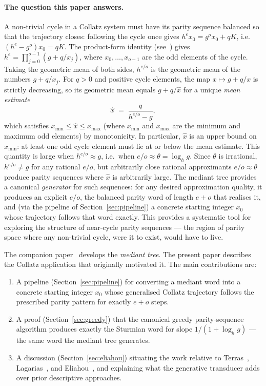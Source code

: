 \documentclass[12pt]{article}
\theoremstyle{definition}
\theoremstyle{remark}
\theoremstyle{plain}
\begin{document}
\paragraph{The question this paper answers.}
A non-trivial cycle in a Collatz system must have its parity sequence balanced so
that the trajectory closes: following the cycle once gives $h^e x_0 = g^o x_0 + qK$,
i.e.\ $(h^e - g^o)x_0 = qK$.
The product-form identity (see~\cite{eliahou1993,paper21}) gives
$h^e = \prod_{j=0}^{o-1}(g + q/x_j)$, where $x_0, \ldots, x_{o-1}$ are the
odd elements of the cycle.
Taking the geometric mean of both sides, $h^{e/o}$ is the geometric mean of the
numbers $g + q/x_j$.
For $q > 0$ and positive cycle elements, the map $x \mapsto g + q/x$ is
strictly decreasing, so its geometric mean equals $g + q/\hat{x}$ for a unique
\emph{mean estimate}
\[
  \hat{x} \;=\; \frac{q}{h^{e/o} - g},
\]
which satisfies $x_{\min} \leq \hat{x} \leq x_{\max}$ (where $x_{\min}$ and
$x_{\max}$ are the minimum and maximum odd elements) by monotonicity.
In particular, $\hat{x}$ is an upper bound on $x_{\min}$: at least one odd cycle
element must lie at or below the mean estimate.
This quantity is large when $h^{e/o} \approx g$, i.e.\ when $e/o \approx \theta = \log_h g$.
Since $\theta$ is irrational, $h^{e/o} \neq g$ for any rational $e/o$, but
arbitrarily close rational approximants $e/o \approx \theta$ produce parity sequences
where $\hat{x}$ is arbitrarily large.
The mediant tree provides a canonical \emph{generator} for such sequences:
for any desired approximation quality, it produces an explicit $e/o$, the balanced
parity word of length $e+o$ that realises it, and (via the pipeline of
Section~\ref{sec:pipeline}) a concrete starting integer $x_0$ whose trajectory
follows that word exactly.
This provides a systematic tool for exploring the structure of near-cycle parity
sequences --- the region of parity space where any non-trivial cycle, were it to exist,
would have to live.

The companion paper~\cite{paper76} develops the \emph{mediant tree}.
The present paper describes the Collatz application that originally motivated it.
The main contributions are:
\begin{enumerate}
  \item A pipeline (Section~\ref{sec:pipeline}) for converting a mediant word into
    a concrete starting integer $x_0$ whose generalised Collatz trajectory follows
    the prescribed parity pattern for exactly $e + o$ steps.
  \item A proof (Section~\ref{sec:greedy}) that the canonical greedy parity-sequence
    algorithm produces exactly the Sturmian word for slope $1/(1+\log_h g)$ ---
    the same word the mediant tree generates.
  \item A discussion (Section~\ref{sec:eliahou}) situating the work relative to
    Terras~\cite{terras1976}, Lagarias~\cite{lagarias1985}, and Eliahou~\cite{eliahou1993},
    and explaining what the generative transducer adds over prior descriptive approaches.
\end{enumerate}
\end{document}
